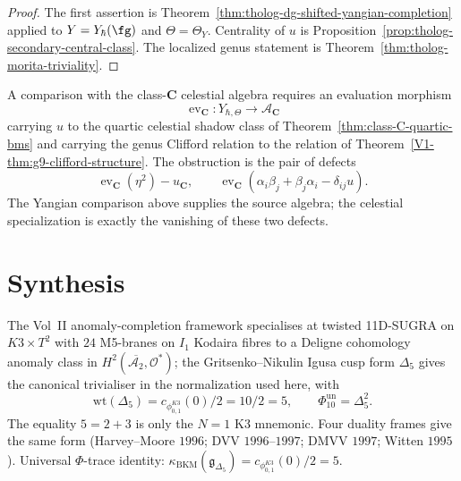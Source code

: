 \begin{proof}
The first assertion is Theorem~\ref{thm:tholog-dg-shifted-yangian-completion}
applied to \(Y=Y_\hbar(\fg)\) and \(\Theta=\Theta_Y\).  Centrality
of \(u\) is Proposition~\ref{prop:tholog-secondary-central-class}.
The localized genus statement is Theorem~\ref{thm:tholog-morita-triviality}.
\end{proof}

\begin{remark}
\label{rem:anomaly-yangian-one-pair}
A comparison with the class-\(\mathbf C\) celestial algebra requires
an evaluation morphism
\[
\operatorname{ev}_{\mathbf C}\colon
Y_{\hbar,\Theta}\longrightarrow \mathcal A_{\mathbf C}
\]
carrying \(u\) to the quartic celestial shadow class of
Theorem~\ref{thm:class-C-quartic-bms} and carrying the genus
Clifford relation to the relation of
Theorem~\ref{V1-thm:g9-clifford-structure}.  The obstruction is the
pair of defects
\[
\operatorname{ev}_{\mathbf C}(\eta^2)-u_{\mathbf C},
\qquad
\operatorname{ev}_{\mathbf C}
(\alpha_i\beta_j+\beta_j\alpha_i-\delta_{ij}u).
\]
The Yangian comparison above supplies the source algebra; the
celestial specialization is exactly the vanishing of these two
defects.
\end{remark}

\section{Synthesis}
\label{sec:ac-core-supplement}

\begin{remark}
\label{rem:ac-core-paramodular}
The Vol~II anomaly-completion framework specialises at twisted
11D-SUGRA on $K3 \times T^2$ with $24$ M5-branes on $I_1$ Kodaira
fibres to a Deligne cohomology anomaly class in
$H^2(\overline{\mathcal{A}_2}, \mathcal{O}^*)$; the
Gritsenko--Nikulin Igusa cusp form $\Delta_5$ gives the canonical
trivialiser in the normalization used here,
with
\[
 \mathrm{wt}(\Delta_5)
 =c_{\phi_{0,1}^{K3}}(0)/2=10/2=5,
 \qquad
 \Phi_{10}^{\mathrm{un}}=\Delta_5^2 .
\]
The equality $5=2+3$ is only the $N=1$ K3 mnemonic. Four duality
frames give the same form (Harvey--Moore $1996$; DVV
$1996$--$1997$; DMVV $1997$; Witten $1995$). Universal
$\Phi$-trace identity:
$\kappa_{\mathrm{BKM}}(\mathfrak{g}_{\Delta_5})
=c_{\phi_{0,1}^{K3}}(0)/2=5$.
\end{remark}
